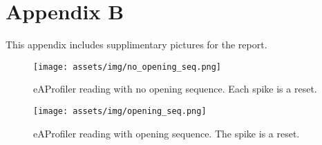 \section{Appendix B}
\label{appenix:b}

This appendix includes supplimentary pictures for the report.

\begin{figure}[ht!]
    \texttt{[image: assets/img/no\_opening\_seq.png]}
    \caption{eAProfiler reading with no opening sequence. Each spike is a reset.}
    \label{fig:no_opening_seq}
\end{figure}

\begin{figure}[ht!]
    \texttt{[image: assets/img/opening\_seq.png]}
    \caption{eAProfiler reading with opening sequence. The spike is a reset.}
    \label{fig:opening_seq}
\end{figure}

